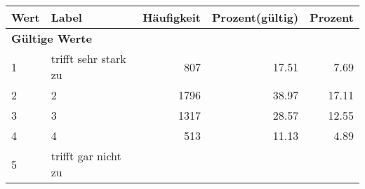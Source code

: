      \begin{longtable}{lXrrr}
     \toprule
     \textbf{Wert} & \textbf{Label} & \textbf{Häufigkeit} & \textbf{Prozent(gültig)} & \textbf{Prozent} \\
     \endhead
     \midrule
     \multicolumn{5}{l}{\textbf{Gültige Werte}}\\

     1 &
     \multicolumn{1}{X}{ trifft sehr stark zu   } &


       \num{807} &
       \num[round-mode=places,round-precision=2]{17,51} &
         \num[round-mode=places,round-precision=2]{7,69} \\

     2 &
     \multicolumn{1}{X}{ 2   } &


       \num{1796} &
       \num[round-mode=places,round-precision=2]{38,97} &
         \num[round-mode=places,round-precision=2]{17,11} \\

     3 &
     \multicolumn{1}{X}{ 3   } &


       \num{1317} &
       \num[round-mode=places,round-precision=2]{28,57} &
         \num[round-mode=places,round-precision=2]{12,55} \\

     4 &
     \multicolumn{1}{X}{ 4   } &


       \num{513} &
       \num[round-mode=places,round-precision=2]{11,13} &
         \num[round-mode=places,round-precision=2]{4,89} \\

     5 &
     \multicolumn{1}{X}{ trifft gar nicht zu   } &



\end{longtable}
